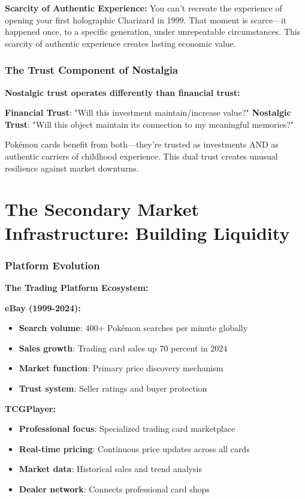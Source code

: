 \documentclass[11pt,oneside]{book}
\begin{document}
\textbf{Scarcity of Authentic Experience:}
You can't recreate the experience of opening your first holographic Charizard in 1999. That moment is scarce—it happened once, to a specific generation, under unrepeatable circumstances. This scarcity of authentic experience creates lasting economic value.

\subsubsection{The Trust Component of Nostalgia}

\textbf{Nostalgic trust operates differently than financial trust:}

\textbf{Financial Trust}: "Will this investment maintain/increase value?"
\textbf{Nostalgic Trust}: "Will this object maintain its connection to my meaningful memories?"

Pokémon cards benefit from both—they're trusted as investments AND as authentic carriers of childhood experience. This dual trust creates unusual resilience against market downturns.

\section{The Secondary Market Infrastructure: Building Liquidity}

\subsubsection{Platform Evolution}

\textbf{The Trading Platform Ecosystem:}

\textbf{eBay (1999-2024):}
\begin{itemize}
\item \textbf{Search volume}: 400+ Pokémon searches per minute globally
\item \textbf{Sales growth}: Trading card sales up 70 percent in 2024
\item \textbf{Market function}: Primary price discovery mechanism
\item \textbf{Trust system}: Seller ratings and buyer protection
\end{itemize}

\textbf{TCGPlayer:}
\begin{itemize}
\item \textbf{Professional focus}: Specialized trading card marketplace
\item \textbf{Real-time pricing}: Continuous price updates across all cards
\item \textbf{Market data}: Historical sales and trend analysis
\item \textbf{Dealer network}: Connects professional card shops
\end{itemize}
\end{document}
